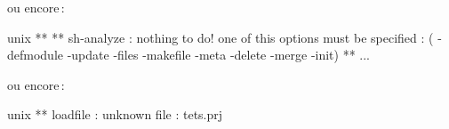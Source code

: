 ou encore\,:

\begin{Longcode*}
unix%
**
** sh-analyze : nothing to do! one of this options must be specified : (
-defmodule -update -files -makefile -meta -delete -merge -init)
**
 ...
\end{Longcode*}

ou encore\,:

\begin{Longcode*}
unix%
** loadfile : unknown file : tets.prj
\end{Longcode*}

